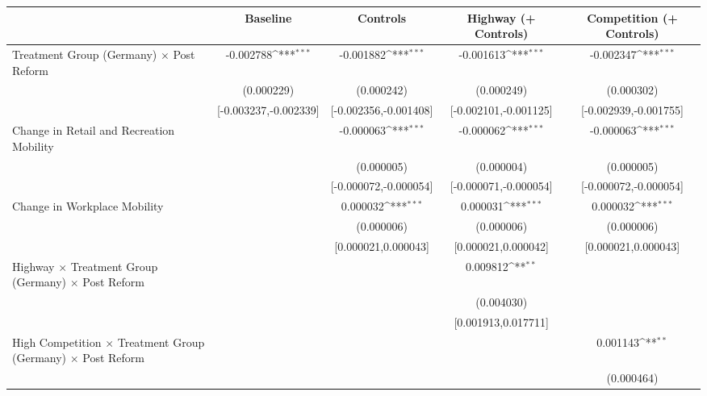 {
\def\sym#1{\ifmmode^{#1}\else\(^{#1}\)\fi}
\begin{tabular}{l*{4}{c}}
\toprule
                    &\multicolumn{1}{c}{Baseline}&\multicolumn{1}{c}{Controls}&\multicolumn{1}{c}{Highway (+ Controls)}&\multicolumn{1}{c}{Competition (+ Controls)}\\
\midrule
Treatment Group (Germany) $\times$ Post Reform&   -0.002788\sym{***}&   -0.001882\sym{***}&   -0.001613\sym{***}&   -0.002347\sym{***}\\
                    &  (0.000229)         &  (0.000242)         &  (0.000249)         &  (0.000302)         \\
                    &[-0.003237,-0.002339]         &[-0.002356,-0.001408]         &[-0.002101,-0.001125]         &[-0.002939,-0.001755]         \\
Change in Retail and Recreation Mobility&                     &   -0.000063\sym{***}&   -0.000062\sym{***}&   -0.000063\sym{***}\\
                    &                     &  (0.000005)         &  (0.000004)         &  (0.000005)         \\
                    &                     &[-0.000072,-0.000054]         &[-0.000071,-0.000054]         &[-0.000072,-0.000054]         \\
Change in Workplace Mobility&                     &    0.000032\sym{***}&    0.000031\sym{***}&    0.000032\sym{***}\\
                    &                     &  (0.000006)         &  (0.000006)         &  (0.000006)         \\
                    &                     &[0.000021,0.000043]         &[0.000021,0.000042]         &[0.000021,0.000043]         \\
Highway $\times$ Treatment Group (Germany) $\times$ Post Reform&                     &                     &    0.009812\sym{**} &                     \\
                    &                     &                     &  (0.004030)         &                     \\
                    &                     &                     &[0.001913,0.017711]         &                     \\
High Competition $\times$ Treatment Group (Germany) $\times$ Post Reform&                     &                     &                     &    0.001143\sym{**} \\
                    &                     &                     &                     &  (0.000464)         \\

\end{tabular}}
